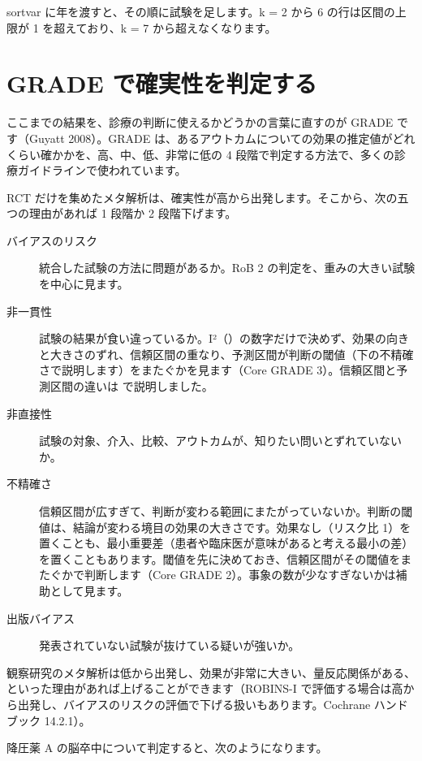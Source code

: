 sortvar に年を渡すと、その順に試験を足します。k = 2 から 6 の行は区間の上限が 1 を超えており、k = 7 から超えなくなります。

\section{GRADE で確実性を判定する}
\label{sec:07-8}

ここまでの結果を、診療の判断に使えるかどうかの言葉に直すのが GRADE です（Guyatt 2008）。GRADE は、あるアウトカムについての効果の推定値がどれくらい確かかを、高、中、低、非常に低の 4 段階で判定する方法で、多くの診療ガイドラインで使われています。

RCT だけを集めたメタ解析は、確実性が高から出発します。そこから、次の五つの理由があれば 1 段階か 2 段階下げます。

\begin{description}
\item[バイアスのリスク] 統合した試験の方法に問題があるか。RoB 2 の判定を、重みの大きい試験を中心に見ます。
\item[非一貫性] 試験の結果が食い違っているか。I²（）の数字だけで決めず、効果の向きと大きさのずれ、信頼区間の重なり、予測区間が判断の閾値（下の不精確さで説明します）をまたぐかを見ます（Core GRADE 3）。信頼区間と予測区間の違いは  で説明しました。
\item[非直接性] 試験の対象、介入、比較、アウトカムが、知りたい問いとずれていないか。
\item[不精確さ] 信頼区間が広すぎて、判断が変わる範囲にまたがっていないか。判断の閾値は、結論が変わる境目の効果の大きさです。効果なし（リスク比 1）を置くことも、最小重要差（患者や臨床医が意味があると考える最小の差）を置くこともあります。閾値を先に決めておき、信頼区間がその閾値をまたぐかで判断します（Core GRADE 2）。事象の数が少なすぎないかは補助として見ます。
\item[出版バイアス] 発表されていない試験が抜けている疑いが強いか。
\end{description}

観察研究のメタ解析は低から出発し、効果が非常に大きい、量反応関係がある、といった理由があれば上げることができます（ROBINS-I で評価する場合は高から出発し、バイアスのリスクの評価で下げる扱いもあります。Cochrane ハンドブック 14.2.1）。

降圧薬 A の脳卒中について判定すると、次のようになります。

